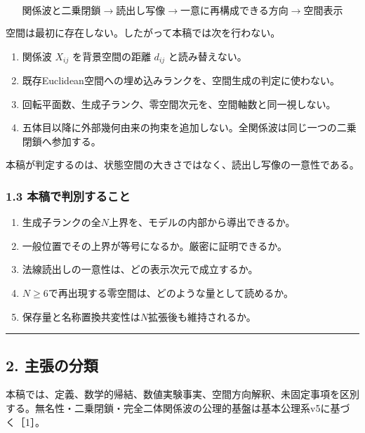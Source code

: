 \documentclass[
  a4paper,
]{ltjsarticle}
\providecommand{\tightlist}{%
  \setlength{\itemsep}{0pt}\setlength{\parskip}{0pt}}
\begin{document}
\[
\boxed{
\text{関係波と二乗閉鎖}
\longrightarrow
\text{読出し写像}
\longrightarrow
\text{一意に再構成できる方向}
\longrightarrow
\text{空間表示}
}
\]

空間は最初に存在しない。したがって本稿では次を行わない。

\begin{enumerate}
\def\labelenumi{\arabic{enumi}.}
\tightlist
\item
  関係波 \(X_{ij}\) を背景空間の距離 \(d_{ij}\) と読み替えない。
\item
  既存Euclidean空間への埋め込みランクを、空間生成の判定に使わない。
\item
  回転平面数、生成子ランク、零空間次元を、空間軸数と同一視しない。
\item
  五体目以降に外部幾何由来の拘束を追加しない。全関係波は同じ一つの二乗閉鎖へ参加する。
\end{enumerate}

本稿が判定するのは、状態空間の大きさではなく、読出し写像の一意性である。

\subsubsection{1.3
本稿で判別すること}\label{ux672cux7a3fux3067ux5224ux5225ux3059ux308bux3053ux3068}

\begin{enumerate}
\def\labelenumi{\arabic{enumi}.}
\tightlist
\item
  生成子ランクの全\(N\)上界を、モデルの内部から導出できるか。
\item
  一般位置でその上界が等号になるか。厳密に証明できるか。
\item
  法線読出しの一意性は、どの表示次元で成立するか。
\item
  \(N\ge6\)で再出現する零空間は、どのような量として読めるか。
\item
  保存量と名称置換共変性は\(N\)拡張後も維持されるか。
\end{enumerate}

\begin{center}\rule{0.5\linewidth}{0.5pt}\end{center}

\subsection{2. 主張の分類}\label{ux4e3bux5f35ux306eux5206ux985e}

本稿では、定義、数学的帰結、数値実験事実、空間方向解釈、未固定事項を区別する。無名性・二乗閉鎖・完全二体関係波の公理的基盤は基本公理系v5に基づく［1］。
\end{document}
